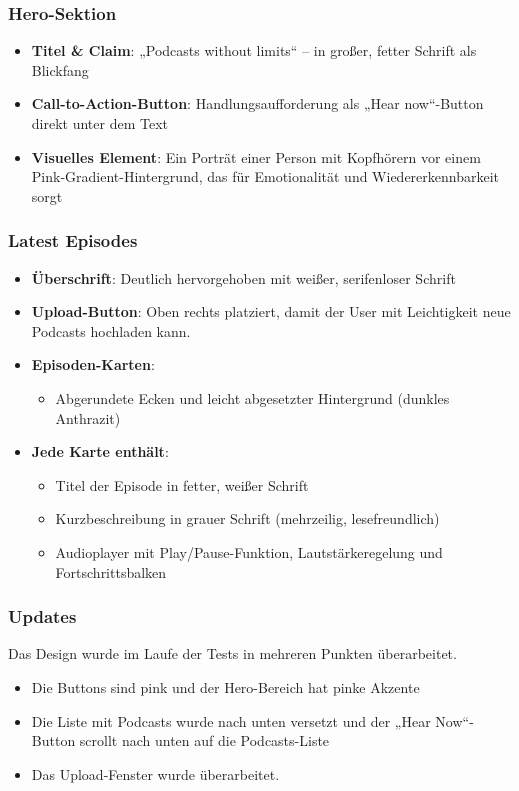 \documentclass{article}
\begin{document}
\subsubsection{Hero-Sektion}
\begin{itemize}
  \item \textbf{Titel \& Claim}: „Podcasts without limits“ – in großer, fetter Schrift als Blickfang
  \item \textbf{Call-to-Action-Button}: Handlungsaufforderung als „Hear now“-Button direkt unter dem Text
  \item \textbf{Visuelles Element}: Ein Porträt einer Person mit Kopfhörern vor einem Pink-Gradient-Hintergrund, das für Emotionalität und Wiedererkennbarkeit sorgt
\end{itemize}

\subsubsection{Latest Episodes}
\begin{itemize}
  \item \textbf{Überschrift}: Deutlich hervorgehoben mit weißer, serifenloser Schrift
  \item \textbf{Upload-Button}: Oben rechts platziert, damit der User mit Leichtigkeit neue Podcasts hochladen kann.
  \item \textbf{Episoden-Karten}:
  \begin{itemize}
    \item Abgerundete Ecken und leicht abgesetzter Hintergrund (dunkles Anthrazit)
  \end{itemize}
  \item \textbf{Jede Karte enthält}:
  \begin{itemize}
    \item Titel der Episode in fetter, weißer Schrift
    \item Kurzbeschreibung in grauer Schrift (mehrzeilig, lesefreundlich)
    \item Audioplayer mit Play/Pause-Funktion, Lautstärkeregelung und Fortschrittsbalken
  \end{itemize}
\end{itemize}

\subsubsection{Updates}
Das Design wurde im Laufe der Tests in mehreren Punkten überarbeitet.

\begin{itemize}
  \item Die Buttons sind pink und der Hero-Bereich hat pinke Akzente
  \item Die Liste mit Podcasts wurde nach unten versetzt und der „Hear Now“-Button scrollt nach unten auf die Podcasts-Liste
  \item Das Upload-Fenster wurde überarbeitet.
\end{itemize}
\end{document}
